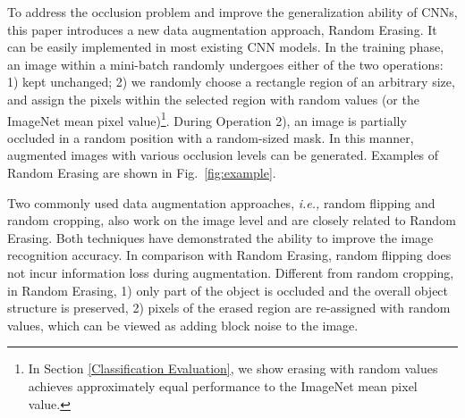 \documentclass[10pt,twocolumn,letterpaper]{article}
\begin{document}
To address the occlusion problem and improve the generalization ability of CNNs, this paper introduces a new data augmentation approach, Random Erasing. It can be easily implemented in most existing CNN models. In the training phase, an image within a mini-batch randomly undergoes either of the two operations: 1) kept unchanged; 2) we randomly choose a rectangle region of an arbitrary size, and assign the pixels within the selected region with random values (or the ImageNet \cite{deng2009imagenet} mean pixel value)\footnote{In Section \ref{Classification Evaluation}, we show erasing with random values achieves approximately equal performance to the ImageNet mean pixel value.}. During Operation 2), an image is partially occluded in a random position with a random-sized mask. 
%
In this manner, augmented images with various occlusion levels can be generated. Examples of Random Erasing are shown in Fig.~\ref{fig:example}. 
    
Two commonly used data augmentation approaches, \emph{i.e.,}  random flipping and random cropping, also work on the image level and are closely related to Random Erasing. Both techniques have demonstrated the ability to improve the image recognition accuracy. In comparison with Random Erasing, random flipping does not incur information loss during augmentation. Different from random cropping, in Random Erasing, 1) only part of the object is occluded and the overall object structure is preserved, 2)  pixels of the erased region are re-assigned with random values, which can be viewed as adding block noise to the image. 
\end{document}
